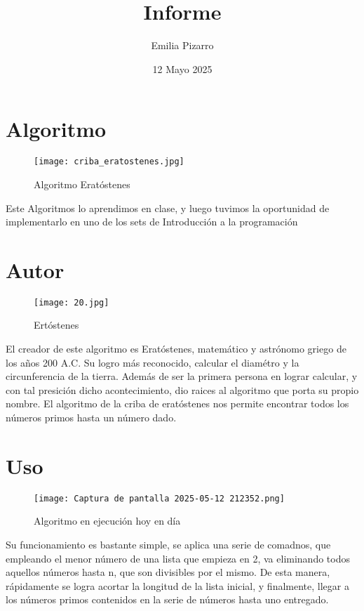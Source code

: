 \documentclass{article}
\title{\textbf{Informe}}
\author{Emilia Pizarro}
\date{12 Mayo 2025}
\begin{document}
\maketitle

\section{Algoritmo}
\begin{figure}[h]
    \centering
    \texttt{[image: criba\_eratostenes.jpg]}
    \caption{Algoritmo Eratóstenes}
    \label{fig:enter-label}
\end{figure}
Este Algoritmos lo aprendimos en clase, y luego tuvimos la oportunidad de implementarlo en uno de los sets de Introducción a la programación
\newpage
\section{Autor}
\begin{figure}[h]
    \centering
    \texttt{[image: 20.jpg]}
    \caption{Ertóstenes}
    \label{fig:enter-label}
\end{figure}
  El creador de este algoritmo es Eratóstenes, matemático y astrónomo griego de los años 200 A.C.
  \newline
  Su logro más reconocido, calcular el diamétro y la circunferencia de la tierra. Además de ser la primera persona en lograr calcular, y con tal presición dicho acontecimiento, dio raices al algoritmo que porta su propio nombre.
  \newline
  El algoritmo de la criba de eratóstenes nos permite encontrar todos los números primos hasta un número dado.

\newpage
\section{Uso}
\begin{figure}[h]    
\centering
    \texttt{[image: Captura de pantalla 2025-05-12 212352.png]}
    \caption{Algoritmo en ejecución hoy en día}
    \label{fig:enter-label}
\end{figure}
Su funcionamiento es bastante simple, se aplica una serie de comadnos, que empleando el menor número de una lista que empieza en 2, va eliminando todos aquellos números hasta n, que son divisibles por el mismo.
\newline
De esta manera, rápidamente se logra acortar la longitud de la lista inicial, y finalmente, llegar a los números primos contenidos en la serie de números hasta uno entregado.
\end{document}
